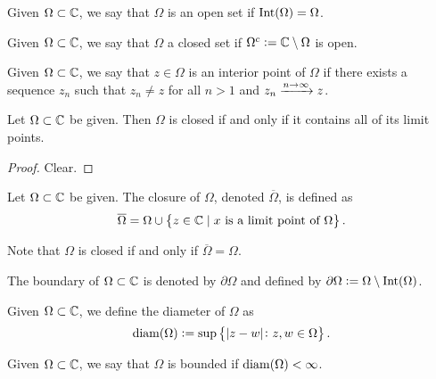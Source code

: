 \documentclass[11pt,a4paper]{article}
\begin{document}
\begin{definition}
    Given $\Omega \subset \mathbb{C}$, we say that $\Omega$ is an open set if
    $\operatorname{Int}(\Omega) = \Omega$.
\end{definition}

\begin{definition}
    Given $\Omega \subset \mathbb{C}$, we say that $\Omega$ a closed set if
    $\Omega^c := \mathbb{C} \setminus \Omega$ is open.
\end{definition}

\begin{definition}
    Given $\Omega \subset \mathbb{C}$, we say that $z \in \Omega$ is an interior
    point of $\Omega$ if there exists a sequence $z_n$ such that
    $z_n \neq z$ for all $n > 1$ and $z_n \xrightarrow{n \to \infty} z$.
\end{definition}

\begin{proposition}
    Let $\Omega \subset \mathbb{C}$ be given.
    Then $\Omega$ is closed if and only if it contains
    all of its limit points.
\end{proposition}
\begin{proof}
    Clear.
\end{proof}

\begin{definition}[Closure]
    Let $\Omega \subset \mathbb{C}$ be given.
    The closure of $\Omega$, denoted $\overline \Omega$, is defined
    as
    \[
        \overline \Omega =
        \Omega \cup
        \set{z \in \mathbb{C}\mid \text{$x$ is a limit point of $\Omega$}}.
    \]
\end{definition}

\begin{remark}
    Note that $\Omega$ is closed if and only if $\overline \Omega = \Omega$.
\end{remark}

\begin{definition}[Boundary]
    The boundary of $\Omega \subset \mathbb{C}$ is denoted by $\partial \Omega$
    and defined by $\partial \Omega := \Omega \setminus \operatorname{Int}(\Omega)$.
\end{definition}

\begin{definition}[Diameter]
    Given $\Omega \subset \mathbb{C}$, we define the diameter of $\Omega$ as
    \[
        \operatorname{diam}(\Omega) := \sup\set{|z - w| \colon z,w \in \Omega}.
    \]
\end{definition}

\begin{definition}
    Given $\Omega \subset \mathbb{C}$, we say that $\Omega$ is bounded if
    $\operatorname{diam}(\Omega) < \infty$.
\end{definition}
\end{document}
